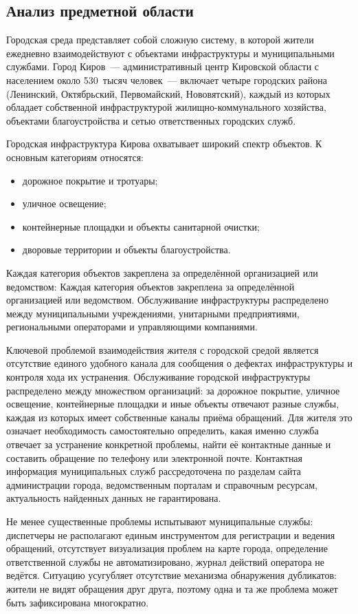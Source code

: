 \subsection{Анализ предметной области}

Городская среда представляет собой сложную систему, в которой жители ежедневно взаимодействуют с объектами инфраструктуры и муниципальными службами. Город Киров~--- административный центр Кировской области с населением около 530~тысяч человек~--- включает четыре городских района (Ленинский, Октябрьский, Первомайский, Нововятский), каждый из которых обладает собственной инфраструктурой жилищно-коммунального хозяйства, объектами благоустройства и сетью ответственных городских служб.

Городская инфраструктура Кирова охватывает широкий спектр объектов. К основным категориям относятся:
\begin{itemize}
    \item дорожное покрытие и тротуары;
    \item уличное освещение;
    \item контейнерные площадки и объекты санитарной очистки;
    \item дворовые территории и объекты благоустройства.
\end{itemize}

Каждая категория объектов закреплена за определённой организацией или ведомством:
Каждая категория объектов закреплена за определённой организацией или ведомством. Обслуживание инфраструктуры распределено между муниципальными учреждениями, унитарными предприятиями, региональными операторами и управляющими компаниями.

Ключевой проблемой взаимодействия жителя с городской средой является отсутствие единого удобного канала для сообщения о дефектах инфраструктуры и контроля хода их устранения. Обслуживание городской инфраструктуры распределено между множеством организаций: за дорожное покрытие, уличное освещение, контейнерные площадки и иные объекты отвечают разные службы, каждая из которых имеет собственные каналы приёма обращений. Для жителя это означает необходимость самостоятельно определить, какая именно служба отвечает за устранение конкретной проблемы, найти её контактные данные и составить обращение по телефону или электронной почте. Контактная информация муниципальных служб рассредоточена по разделам сайта администрации города, ведомственным порталам и справочным ресурсам, актуальность найденных данных не гарантирована.

Не менее существенные проблемы испытывают муниципальные службы: диспетчеры не располагают единым инструментом для регистрации и ведения обращений, отсутствует визуализация проблем на карте города, определение ответственной службы не автоматизировано, журнал действий оператора не ведётся. Ситуацию усугубляет отсутствие механизма обнаружения дубликатов: жители не видят обращения друг друга, поэтому одна и та же проблема может быть зафиксирована многократно.

